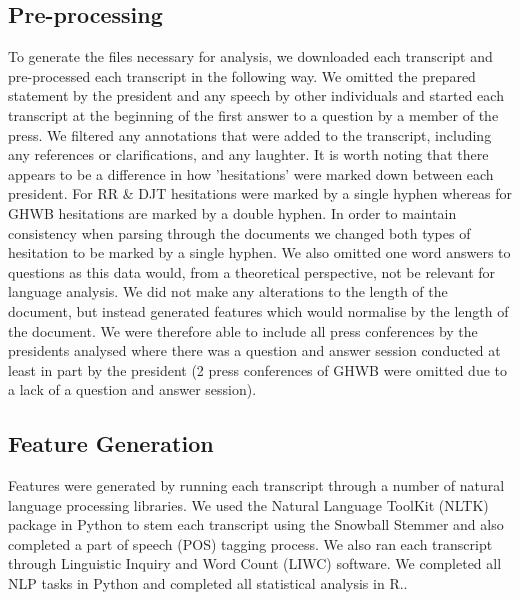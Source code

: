 \documentclass[12pt]{article}
\begin{document}
\subsection{Pre-processing}
To generate the files necessary for analysis, we downloaded each transcript and pre-processed each transcript in the following way. We omitted the prepared statement by the president and any speech by other individuals and started each transcript at the beginning of the first answer to a question by a member of the press. We filtered any annotations that were added to the transcript, including any references or clarifications, and any laughter. It is worth noting that there appears to be a difference in how 'hesitations' were marked down between each president. For RR \& DJT hesitations were marked by a single hyphen whereas for GHWB hesitations are marked by a double hyphen. In order to maintain consistency when parsing through the documents we changed both types of hesitation to be marked by a single hyphen. We also omitted one word answers to questions as this data would, from a theoretical perspective, not be relevant for language analysis. We did not make any alterations to the length of the document, but instead generated features which would normalise by the length of the document. We were therefore able to include all press conferences by the presidents analysed where there was a question and answer session conducted at least in part by the president (2 press conferences of GHWB were omitted due to a lack of a question and answer session).

\subsection{Feature Generation}
Features were generated by running each transcript through a number of natural language processing libraries. We used the Natural Language ToolKit (NLTK) package \cite{Bird2009} in Python to stem each transcript using the Snowball Stemmer and also completed a part of speech (POS) tagging process. We also ran each transcript through Linguistic Inquiry and Word Count (LIWC) \cite{Pennebaker2015} software. We completed all NLP tasks in Python and completed all statistical analysis in R.. 
\par 
\end{document}
